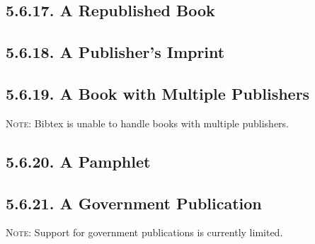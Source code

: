 \documentclass[12pt]{article}
\begin{document}
\nocite{riccoboni98aa}\nocite{neruda91aa}\nocite{murck00aa}\nocite{mitchell-boyask02aa}

\printbibliography[heading=blank,segment=16]

\subsection*{5.6.17. A Republished Book}
\newrefsegment

\nocite{dreiser00aa}\nocite{douglas93aa}\nocite{doctorow96aa}\nocite{atwood01aa}\nocite{ishiguro01aa}

\printbibliography[heading=blank,segment=17]

\subsection*{5.6.18. A Publisher's Imprint}
\newrefsegment

\nocite{cassidy85aa}\nocite{lopate94aa}\nocite{morrison02aa}

\printbibliography[heading=blank,segment=18]

\subsection*{5.6.19. A Book with Multiple Publishers}
\newrefsegment

\textsc{Note:} Bibtex is unable to handle books with multiple publishers.


\subsection*{5.6.20. A Pamphlet}
\newrefsegment

\nocite{washingtondc00aa}\nocite{renoir94aa}

\printbibliography[heading=blank,segment=20]

\subsection*{5.6.21. A Government Publication}
\newrefsegment

\textsc{Note:} Support for government publications is currently limited.
\end{document}
